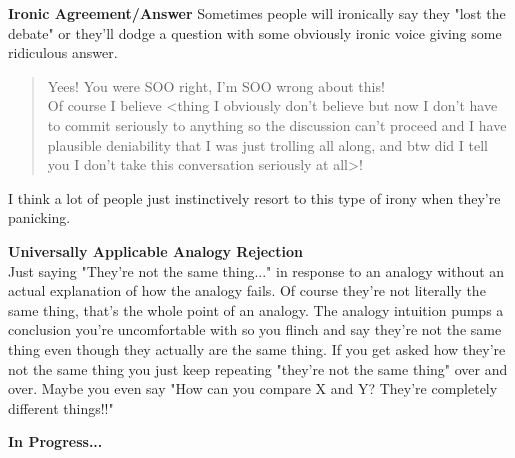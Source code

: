 \documentclass[12pt,english]{article}
\begin{document}
\par
\textbf{Ironic Agreement/Answer} Sometimes people will ironically say they "lost the debate" or they'll dodge a question with some obviously ironic voice giving some ridiculous answer.\\
\begin{quote}

Yees! You were SOO right, I'm SOO wrong about this!\\ Of course I believe <thing I obviously don't believe but now I don't have to commit seriously to anything so the discussion can't proceed and I have plausible deniability that I was just trolling all along, and btw did I tell you I don't take this conversation seriously at all>!\\
\end{quote}
I think a lot of people just instinctively resort to this type of irony when they're panicking.
\par
\textbf{Universally Applicable Analogy Rejection}\\
Just saying "They're not the same thing..." in response to an analogy without an actual explanation of how the analogy fails. Of course they're not literally the same thing, that's the whole point of an analogy. The analogy intuition pumps a conclusion you're uncomfortable with so you flinch and say they're not the same thing even though they actually are the same thing. If you get asked how they're not the same thing you just keep repeating "they're not the same thing" over and over. Maybe you even say "How can you compare X and Y? They're completely different things!!"
\par
\textbf{In Progress...}
\end{document}
